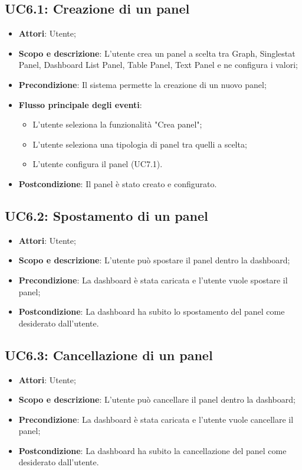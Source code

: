 \subsection{UC6.1: Creazione di un panel}
\hypertarget{UC6.1}{}
\begin{itemize}
	\item \textbf{Attori}: Utente;
	\item \textbf{Scopo e descrizione}: L'utente crea un panel a scelta tra Graph, Singlestat Panel, Dashboard List Panel, Table Panel, Text Panel e ne configura i valori;
	\item \textbf{Precondizione}: Il sistema permette la creazione di un nuovo panel;
	\item \textbf{Flusso principale degli eventi}:
	\begin{itemize}
		\item L'utente seleziona la funzionalità "Crea panel";
		\item L'utente seleziona una tipologia di panel tra quelli a scelta;
		\item L'utente configura il panel (UC7.1).
	\end{itemize}
	\item \textbf{Postcondizione}: Il panel è stato creato e configurato.
\end{itemize}
\subsection{UC6.2: Spostamento di un panel}
\hypertarget{UC6.2}{}
\begin{itemize}
	\item \textbf{Attori}: Utente;
	\item \textbf{Scopo e descrizione}: L'utente può spostare il panel dentro la dashboard;
	\item \textbf{Precondizione}: La dashboard è stata caricata e l'utente vuole spostare il panel;
	\item \textbf{Postcondizione}: La dashboard ha subito lo spostamento del panel come desiderato dall'utente.
\end{itemize}
\subsection{UC6.3: Cancellazione di un panel}
\hypertarget{UC6.3}{}
\begin{itemize}
	\item \textbf{Attori}: Utente;
	\item \textbf{Scopo e descrizione}: L'utente può cancellare il panel dentro la dashboard;
	\item \textbf{Precondizione}: La dashboard è stata caricata e l'utente vuole cancellare il panel;
	\item \textbf{Postcondizione}: La dashboard ha subito la cancellazione del panel come desiderato dall'utente.
\end{itemize}
